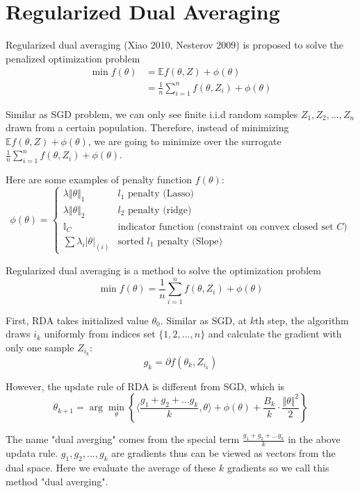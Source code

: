 \section{Regularized Dual Averaging}

Regularized dual averaging (Xiao 2010, Nesterov 2009) is proposed to solve the penalized optimization problem
\begin{align*}
	\min f(\theta) &= \mathbb{E}f(\theta,Z) + \phi(\theta)\\
		&= \frac{1}{n}\sum_{i=1}^n f(\theta,Z_i) + \phi(\theta)
\end{align*}

Similar as SGD problem, we can only see finite i.i.d random samples $Z_1, Z_2, ..., Z_n$ drawn from a certain population. Therefore, instead of minimizing $\mathbb{E}f(\theta,Z) + \phi(\theta)$, we are going to minimize over the surrogate $\frac{1}{n}\sum_{i=1}^n f(\theta,Z_i) + \phi(\theta)$.

Here are some examples of penalty function $f(\theta)$:
\begin{equation*}
	\phi(\theta) = \begin{cases} 
		\lambda\Vert \theta \Vert_1 &\text{$l_1$ penalty (Lasso)}\\
		\lambda\Vert \theta \Vert_2 &\text{$l_2$ penalty (ridge)}\\
		\mathbb{I}_C &\text{indicator function (constraint on convex closed set $C$)}\\
		\sum \lambda_i|\theta|_{(i)} &\text{sorted $l_1$ penalty (Slope)}
	\end{cases}
\end{equation*}

Regularized dual averaging is a method to solve the optimization problem
\begin{equation*}
	\min f(\theta) = \frac{1}{n}\sum_{i=1}^n f(\theta,Z_i) + \phi(\theta)
\end{equation*}

First, RDA takes initialized value $\theta_0$. Similar as SGD, at $k$th step, the algorithm draws $i_k$ uniformly from indices set $\{1,2,...,n\}$ and calculate the gradient with only one sample $Z_{i_k}$:
\[ g_k = \partial f(\theta_k, Z_{i_k}) \]

However, the update rule of RDA is different from SGD, which is
\[ \theta_{k+1} = \arg\min_\theta \left\{ \langle \frac{g_1 + g_2 + ... g_k}{k}, \theta \rangle + \phi(\theta) + \frac{B_k}{k}\cdot\frac{\Vert \theta \Vert^2}{2}  \right\}  \]

The name "dual averging" comes from the special term $\frac{g_1 + g_2 + ... g_k}{k}$ in the above updata rule. $g_1, g_2, ..., g_k$ are gradients thus can be viewed as vectors from the dual space. Here we evaluate the average of these $k$ gradients so we call this method "dual averging".


